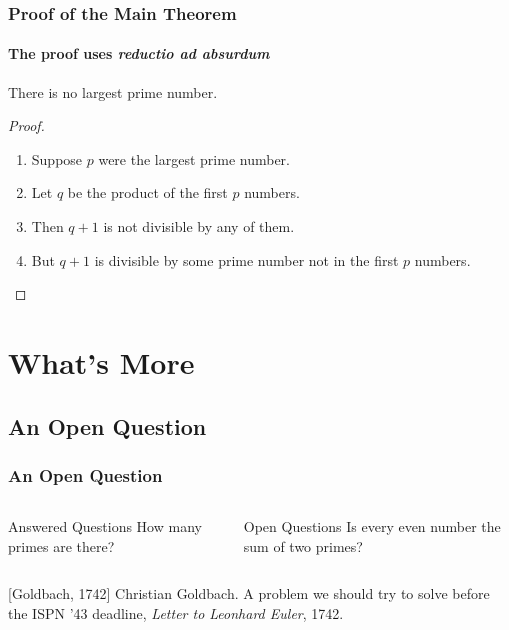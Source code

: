 \documentclass{beamer}
\begin{document}
\begin{frame}
    \frametitle{Proof of the Main Theorem}
    \framesubtitle{The proof uses \textit{reductio ad absurdum}}

    \begin{theorem}
        There is no largest prime number.
    \end{theorem}

    \begin{proof}
        \begin{enumerate}
            \item<1-| alert@1> Suppose $p$ were the largest prime number.
            \item<2-> Let $q$ be the product of the first $p$ numbers.
            \item<3-> Then $q + 1$ is not divisible by any of them.
            \item<1-> But $q + 1$ is divisible by some prime number not in the first $p$ numbers.\qedhere
        \end{enumerate}
    \end{proof}

\end{frame}

\section{What's More}

\subsection{An Open Question}

\begin{frame}
    \frametitle{An Open Question}

    \begin{columns}
        \begin{block}{Answered Questions}
            How many primes are there?
        \end{block}

        \begin{block}{Open Questions}
            Is every even number the sum of two primes?
            \cite{Goldbach1742}
        \end{block}
    \end{columns}

    \begin{thebibliography}{10}
        [Goldbach, 1742]
        Christian Goldbach.
        \newblock A problem we should try to solve before the ISPN '43 deadline,
        \newblock \emph{Letter to Leonhard Euler}, 1742.
    \end{thebibliography}
\end{frame}
\end{document}
